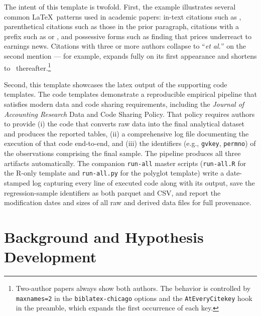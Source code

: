 \documentclass[english,12pt]{article}
\begin{document}

The intent of this template is twofold. First, the example illustrates several common \LaTeX\ patterns used in academic papers: in-text citations such as \citet{bernard1989post}, parenthetical citations such as those in the prior paragraph, citations with a prefix such as \citep[see][p.~37]{petersen2009estimating} or \citep[e.g.,][]{petersen2009estimating}, and possessive forms such as  finding that prices underreact to earnings news. Citations with three or more authors collapse to ``\textit{et al.}'' on the second mention --- for example, \citet{bentley2018disentangling} expands fully on its first appearance and shortens to \citet{bentley2018disentangling}~thereafter.\footnote{Two-author papers always show both authors. The behavior is controlled by \texttt{maxnames=2} in the \texttt{biblatex-chicago} options and the \texttt{AtEveryCitekey} hook in the preamble, which expands the first occurrence of each key.}

Second, this template showcases the latex output of the supporting code templates. The code templates demonstrate a reproducible empirical pipeline that satisfies modern data and code sharing requirements, including the \textit{Journal of Accounting Research} Data and Code Sharing Policy. That policy requires authors to provide (i) the code that converts raw data into the final analytical dataset and produces the reported tables, (ii) a comprehensive log file documenting the execution of that code end-to-end, and (iii) the identifiers (e.g., \texttt{gvkey}, \texttt{permno}) of the observations comprising the final sample. The pipeline produces all three artifacts automatically. The companion \texttt{run-all} master scripts (\texttt{run-all.R} for the R-only template and \texttt{run-all.py} for the polyglot template) write a date-stamped log capturing every line of executed code along with its output, save the regression-sample identifiers as both parquet and CSV, and report the modification dates and sizes of all raw and derived data files for full provenance.


\section{Background and Hypothesis Development}\label{sec:background}
\end{document}
